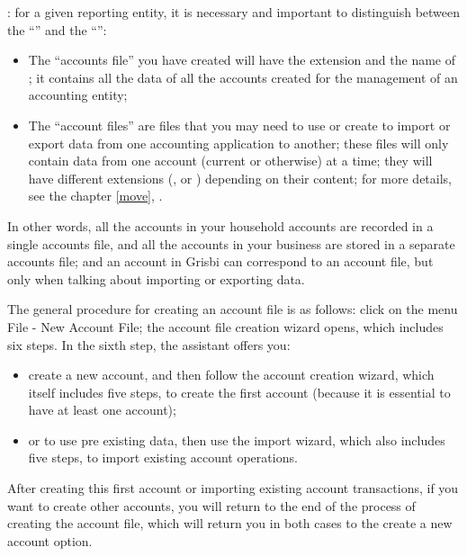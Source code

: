 : for a given reporting entity, it is necessary and important to distinguish between the  \enquote{} and the  \enquote{}:
\begin{itemize}

\item The \enquote{accounts file} you have created will have the extension  and the name of ; it contains all the data of all the accounts created for the management of an accounting entity;

\item The \enquote{account files} are files that you may need to use or create to import or export data from one accounting application to another; these files will only contain data from one account (current or otherwise) at a time; they will have different extensions (,  or ) depending on their content; for more details, see the chapter \vref{move}, .
\end{itemize}

In other words, all the accounts in your household accounts are recorded in a single accounts file, and all the accounts in your business are stored in a separate accounts file; and an account in Grisbi can correspond to an account file, but only when talking about importing or exporting data.


The general procedure for creating an account file is as follows: click on the menu File - New Account File; the account file creation wizard opens, which includes six steps. In the sixth step, the assistant offers you:

\begin{itemize}
\item  create a new account, and then follow the account creation wizard, which itself includes five steps, to create the first account (because it is essential to have at least one account);
\item or to use pre existing data, then use the import wizard, which also includes five steps, to import existing account operations.
\end{itemize}

After creating this first account or importing existing account transactions, if you want to create other accounts, you will return to the end of the process of creating the account file, which will return you in both cases to the create a new account option.


